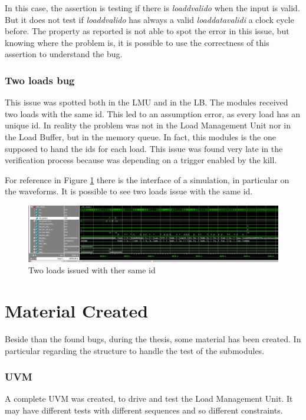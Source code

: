 In this case, the assertion is testing if there is \emph{load\+dvalid\+o} when the input is valid. But it does not test if \emph{load\+dvalid\+o} has always a valid \emph{load\+data\+valid\+i} a clock cycle before.
The property as reported is not able to spot the error in this issue, but knowing where the problem is, it is possible to use the correctness of this assertion to understand the bug.

\subsubsection{Two loads bug}
This issue was spotted both in the LMU and in the LB. The modules received two loads with the same id. This led to an assumption error, as every load has an unique id.
In reality the problem was not in the Load Management Unit nor in the Load Buffer, but in the memory queue. In fact, this modules is the one supposed to hand the ids for each load.
This issue was found very late in the verification process because was depending on a trigger enabled by the kill.

For reference in Figure \ref{2-loads} there is the interface of a simulation, in particular on the waveforms. It is possible to see two loads issue with the same id.

\begin{figure}[H]
    \centering
    \includegraphics[scale = 0.25]{Chapter_3/img/2-loads.png}
    \caption{Two loads issued with ther same id}
    \label{2-loads}
\end{figure}


\section{Material Created}
Beside than the found bugs, during the thesis, some material has been created.
In particular regarding the structure to handle the test of the submodules.

\subsubsection{UVM}
A complete UVM was created, to drive and test the Load Management Unit. It may have different tests with different sequences and so different constraints.

